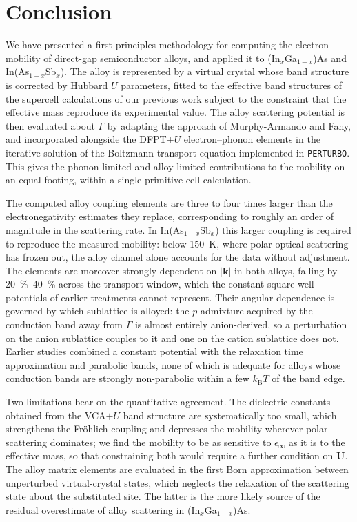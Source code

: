 \documentclass[aps,prmaterials,reprint,amsmath,amssymb,superscriptaddress]{revtex4-2}
\begin{document}
\section{Conclusion}

We have presented a first-principles methodology for computing the electron mobility of direct-gap semiconductor alloys, and applied it to (In$_x$Ga$_{1-x}$)As and In(As$_{1-x}$Sb$_{x}$). The alloy is represented by a virtual crystal whose band structure is corrected by Hubbard $U$ parameters, fitted to the effective band structures of the supercell calculations of our previous work\cite{Gentles2026a} subject to the constraint that the effective mass reproduce its experimental value. The alloy scattering potential is then evaluated about $\Gamma$ by adapting the approach of Murphy-Armando and Fahy\cite{MurphyArmando2008}, and incorporated alongside the DFPT$+U$ electron--phonon elements in the iterative solution of the Boltzmann transport equation implemented in \texttt{PERTURBO}. This gives the phonon-limited and alloy-limited contributions to the mobility on an equal footing, within a single primitive-cell calculation.

The computed alloy coupling elements are three to four times larger than the electronegativity estimates they replace, corresponding to roughly an order of magnitude in the scattering rate. In In(As$_{1-x}$Sb$_{x}$) this larger coupling is required to reproduce the measured mobility: below \SI{150}{\kelvin}, where polar optical scattering has frozen out, the alloy channel alone accounts for the data without adjustment. The elements are moreover strongly dependent on $|\bm{k}|$ in both alloys, falling by \SIrange{20}{40}{\percent} across the transport window, which the constant square-well potentials of earlier treatments cannot represent. Their angular dependence is governed by which sublattice is alloyed: the $p$ admixture acquired by the conduction band away from $\Gamma$ is almost entirely anion-derived, so a perturbation on the anion sublattice couples to it and one on the cation sublattice does not. Earlier studies combined a constant potential with the relaxation time approximation and parabolic bands, none of which is adequate for alloys whose conduction bands are strongly non-parabolic within a few $k_\text{B}T$ of the band edge.

Two limitations bear on the quantitative agreement. The dielectric constants obtained from the VCA$+U$ band structure are systematically too small, which strengthens the Fr{\"o}hlich coupling and depresses the mobility wherever polar scattering dominates; we find the mobility to be as sensitive to $\epsilon_\infty$ as it is to the effective mass, so that constraining both would require a further condition on $\bm{U}$. The alloy matrix elements are evaluated in the first Born approximation between unperturbed virtual-crystal states, which neglects the relaxation of the scattering state about the substituted site. The latter is the more likely source of the residual overestimate of alloy scattering in (In$_x$Ga$_{1-x}$)As.
\end{document}

